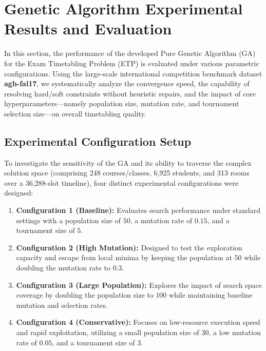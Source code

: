 
\section{Genetic Algorithm Experimental Results and Evaluation}
\label{sec:ga_experimental_results}

In this section, the performance of the developed Pure Genetic Algorithm (GA) for the Exam Timetabling Problem (ETP) is evaluated under various parametric configurations. Using the large-scale international competition benchmark dataset \textbf{agh-fal17}, we systematically analyze the convergence speed, the capability of resolving hard/soft constraints without heuristic repairs, and the impact of core hyperparameters—namely population size, mutation rate, and tournament selection size—on overall timetabling quality.

\subsection{Experimental Configuration Setup}
\label{subsec:experimental_configurations}

To investigate the sensitivity of the GA and its ability to traverse the complex solution space (comprising 248 courses/classes, 6,925 students, and 313 rooms over a 36,288-slot timeline), four distinct experimental configurations were designed:
\begin{enumerate}
    \item \textbf{Configuration 1 (Baseline):} Evaluates search performance under standard settings with a population size of $50$, a mutation rate of $0.15$, and a tournament size of $5$.
    \item \textbf{Configuration 2 (High Mutation):} Designed to test the exploration capacity and escape from local minima by keeping the population at $50$ while doubling the mutation rate to $0.3$.
    \item \textbf{Configuration 3 (Large Population):} Explores the impact of search space coverage by doubling the population size to $100$ while maintaining baseline mutation and selection rates.
    \item \textbf{Configuration 4 (Conservative):} Focuses on low-resource execution speed and rapid exploitation, utilizing a small population size of $30$, a low mutation rate of $0.05$, and a tournament size of $3$.
\end{enumerate}

